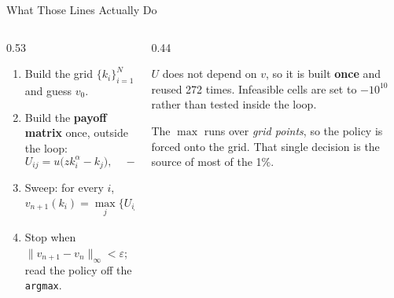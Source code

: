 \begin{frame}{What Those Lines Actually Do}
\begin{columns}[T]
\begin{column}{0.53\textwidth}
\small
\begin{enumerate}\footnotesize
  \item Build the grid $\{k_i\}_{i=1}^{N}$ and guess $v_0$.
  \item Build the \textbf{payoff matrix} once, outside the loop:
  \[ U_{ij}=u\big(zk_i^{\alpha}-k_j\big), \quad -\infty \text{ if } c\le0. \]
  \item Sweep: for every $i$,
  \[ v_{n+1}(k_i)=\max_{j}\Big\{U_{ij}+\beta\textstyle\sum_m \Pi_{jm} v_n(k_j,z_m)\Big\}. \]
  \item Stop when $\lVert v_{n+1}-v_n\rVert_\infty<\varepsilon$; read the policy off the \texttt{argmax}.
\end{enumerate}
\end{column}
\begin{column}{0.44\textwidth}
\begin{conceptbox}[title=\textbf{The one trick worth naming}]\small
$U$ does not depend on $v$, so it is built \textbf{once} and reused 272 times. Infeasible cells are set to $-10^{10}$ rather than tested inside the loop.
\end{conceptbox}
\medskip
\begin{cautionbox}\footnotesize
The $\max$ runs over \emph{grid points}, so the policy is forced onto the grid. That single decision is the source of most of the 1\%.
\end{cautionbox}
\end{column}
\end{columns}
\vspace{1mm}
\end{frame}

